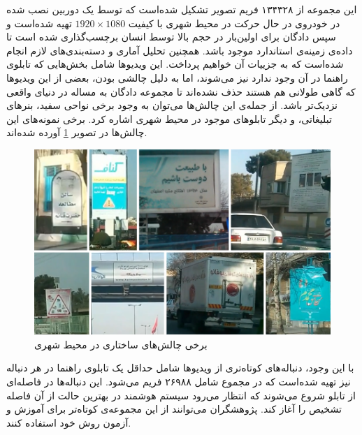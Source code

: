 این مجموعه از ۱۳۴۳۲۸ فریم تصویر تشکیل شده‌است که توسط یک دوربین نصب شده در خودروی در حال حرکت در محیط شهری با کیفیت $1920 \times 1080$ تهیه شده‌است و سپس دادگان برای اولین‌بار در حجم بالا توسط انسان برچسب‌گذاری شده است تا داده‌ی زمینه‌ی استاندارد موجود باشد. همچنین تحلیل آماری و دسته‌بندی‌های لازم انجام شده‌است که به جزییات آن خواهیم پرداخت. این ویدیوها شامل بخش‌هایی که تابلوی راهنما در آن وجود ندارد نیز می‌شوند، اما به دلیل چالشی بودن، بعضی از این ویدیوها که گاهی طولانی هم هستند حذف نشده‌اند تا مجموعه دادگان به مساله در دنیای واقعی نزدیک‌تر باشد. از جمله‌ی این چالش‌ها می‌توان به وجود برخی نواحی سفید، بنرهای تبلیغاتی، و دیگر تابلوهای موجود در محیط شهری اشاره کرد. برخی نمونه‌های این چالش‌ها در تصویر \ref{fig:chall1} آورده‌ شده‌اند. 
\begin{figure}[ht]
\centering
    	\includegraphics[width=13cm]{Figures/chall1.png}
\caption{برخی چالش‌های ساختاری در محیط شهری}
\label{fig:chall1}
\end{figure}
با این وجود، دنباله‌های کوتاه‌تری از ویدیوها شامل حداقل یک تابلوی راهنما در هر دنباله نیز تهیه شده‌است که در مجموع شامل ۲۶۹۸۸ فریم می‌شود. این دنباله‌ها در فاصله‌ای از تابلو شروع می‌شوند که انتظار می‌رود سیستم هوشمند در بهترین حالت از آن فاصله تشخیص را آغاز کند. پژوهشگران می‌توانند از این مجموعه‌ی کوتاه‌تر برای آموزش و آزمون روش خود استفاده کنند. 

